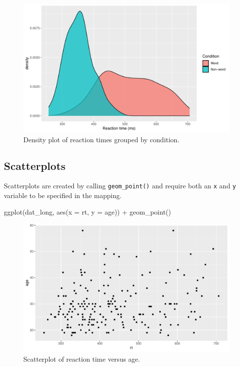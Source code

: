 \documentclass[
  english,
  doc,floatsintext]{apa6}
\newenvironment{Shaded}{\begin{snugshade}}{\end{snugshade}}
\newcommand{\AttributeTok}[1]{\textcolor[rgb]{0.77,0.63,0.00}{#1}}
\newcommand{\FunctionTok}[1]{\textcolor[rgb]{0.00,0.00,0.00}{#1}}
\newcommand{\NormalTok}[1]{#1}
\newcommand{\SpecialCharTok}[1]{\textcolor[rgb]{0.00,0.00,0.00}{#1}}
\begin{document}
\begin{figure}

{\centering \includegraphics[width=1\linewidth]{images/density-grouped-1} 

}

\caption{Density plot of reaction times grouped by condition.}\label{fig:density-grouped}
\end{figure}

\hypertarget{scatterplots}{%
\subsection{Scatterplots}\label{scatterplots}}

Scatterplots are created by calling \texttt{geom\_point()} and require both an \texttt{x} and \texttt{y} variable to be specified in the mapping.

\begin{Shaded}
\begin{Highlighting}[]
\FunctionTok{ggplot}\NormalTok{(dat\_long, }\FunctionTok{aes}\NormalTok{(}\AttributeTok{x =}\NormalTok{ rt, }\AttributeTok{y =}\NormalTok{ age)) }\SpecialCharTok{+}
  \FunctionTok{geom\_point}\NormalTok{()}
\end{Highlighting}
\end{Shaded}

\begin{figure}

{\centering \includegraphics[width=1\linewidth]{images/point-plot-1} 

}

\caption{Scatterplot of reaction time versus age.}\label{fig:point-plot}
\end{figure}
\end{document}
